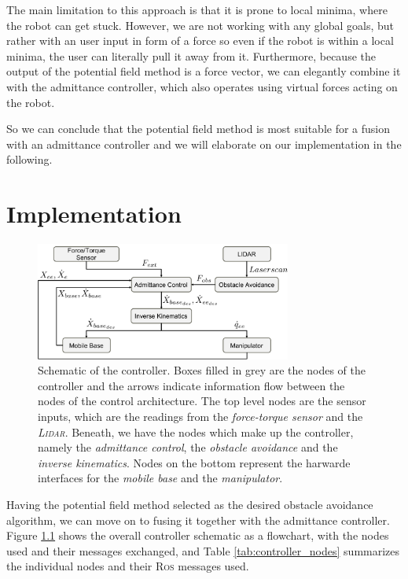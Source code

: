 The main limitation to this approach is that it is prone to local minima, where the robot can get stuck. However, we are not working with any global goals, but rather with an user input in form of a force so even if the robot is within a local minima, the user can literally pull it away from it. Furthermore, because the output of the potential field method is a force vector, we can elegantly combine it with the admittance controller, which also operates using virtual forces acting on the robot. 

So we can conclude that the potential field method is most suitable for a fusion with an admittance controller and we will elaborate on our implementation in the following.

\chapter{Implementation}
\label{sec:implementation}
\begin{figure}
   \centering
   \includegraphics[width=0.75\textwidth]{images/controller_overview.pdf}
   \caption{Schematic of the controller. Boxes filled in grey are the nodes of the controller and the arrows indicate information flow between the nodes of the control architecture. The top level nodes are the sensor inputs, which are the readings from the \emph{force-torque sensor} and the \emph{\textsc{Lidar}}. Beneath, we have the nodes which make up the controller, namely the \emph{admittance control}, the \emph{obstacle avoidance} and the \emph{inverse kinematics}. Nodes on the bottom represent the harwarde interfaces for the \emph{mobile base} and the \emph{manipulator}.}
   \label{pics:controller_overview}
\end{figure}

Having the potential field method selected as the desired obstacle avoidance algorithm, we can move on to fusing it together with the admittance controller. Figure \ref{pics:controller_overview} shows the overall controller schematic as a flowchart, with the nodes used and their messages exchanged, and Table \ref{tab:controller_nodes} summarizes the individual nodes and their \textsc{Ros} messages used.


